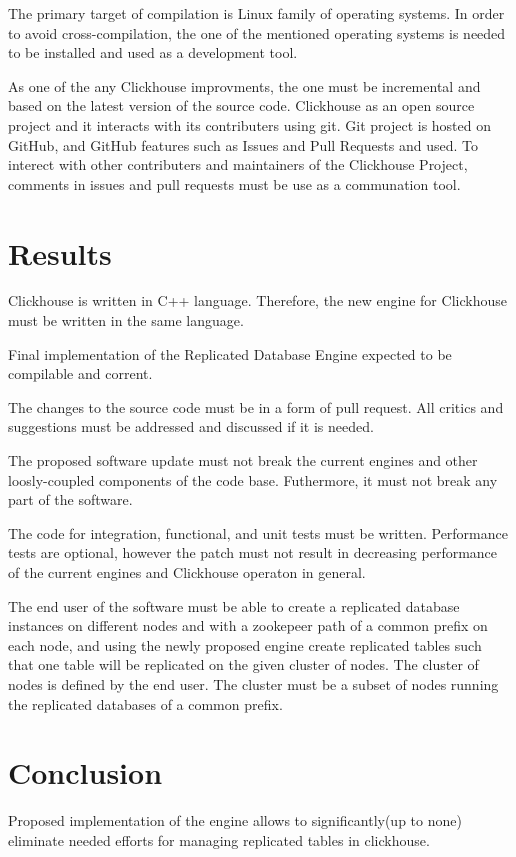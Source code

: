 \documentclass[conference]{IEEEtran}
\begin{document}
The primary target of compilation is Linux family of operating systems.
In order to avoid cross-compilation, the one of the mentioned operating systems
is needed to be installed and used as a development tool. 

As one of the any Clickhouse improvments, the one must be incremental and based
on the latest version of the source code. Clickhouse as an open source project and it
interacts with its contributers using git. Git project is hosted on GitHub, and
GitHub features such as Issues and Pull Requests and used. To interect with other
contributers and maintainers of the Clickhouse Project, comments in issues and
pull requests must be use as a communation tool.

\section{Results}
Clickhouse is written in C++ language. Therefore, the new engine for Clickhouse
must be written in the same language.

Final implementation of the Replicated Database Engine expected to be compilable
and corrent.

The changes to the source code must be in a form of pull request. All critics and suggestions
must be addressed and discussed if it is needed.

The proposed software update must not break the current engines and other loosly-coupled
components of the code base. Futhermore, it must not break any part of the software.

The code for integration, functional, and unit tests must be written.
Performance tests are optional, however the patch must not result in decreasing
performance of the current engines and Clickhouse operaton in general.

The end user of the software must be able to create a replicated
database instances on different nodes and with a zookepeer path of a common prefix
on each node, and using the newly proposed engine create replicated tables such that
one table will be replicated on the given cluster of nodes. The cluster of nodes
is defined by the end user. The cluster must be a subset of nodes running the replicated 
databases of a common prefix.

\section{Conclusion}
Proposed implementation of the engine allows to significantly(up to none) eliminate
needed efforts for managing replicated tables in clickhouse.
\end{document}
